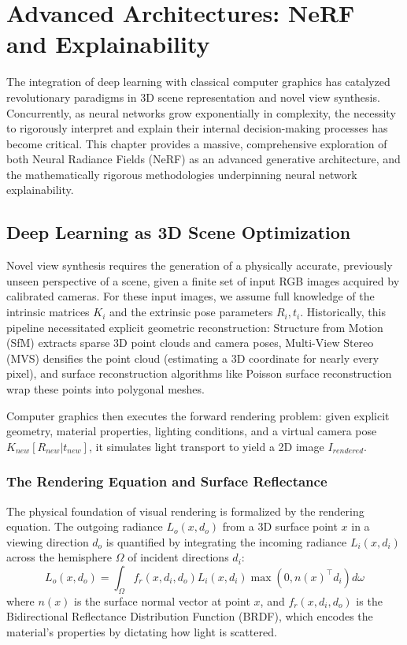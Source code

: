 \chapter{Advanced Architectures: NeRF and Explainability}
\label{ch:advanced_architectures}

The integration of deep learning with classical computer graphics has catalyzed revolutionary paradigms in 3D scene representation and novel view synthesis. Concurrently, as neural networks grow exponentially in complexity, the necessity to rigorously interpret and explain their internal decision-making processes has become critical. This chapter provides a massive, comprehensive exploration of both Neural Radiance Fields (NeRF) as an advanced generative architecture, and the mathematically rigorous methodologies underpinning neural network explainability.

\section{Deep Learning as 3D Scene Optimization}

Novel view synthesis requires the generation of a physically accurate, previously unseen perspective of a scene, given a finite set of input RGB images acquired by calibrated cameras. For these input images, we assume full knowledge of the intrinsic matrices $K_i$ and the extrinsic pose parameters $R_i, t_i$. Historically, this pipeline necessitated explicit geometric reconstruction: Structure from Motion (SfM) extracts sparse 3D point clouds and camera poses, Multi-View Stereo (MVS) densifies the point cloud (estimating a 3D coordinate for nearly every pixel), and surface reconstruction algorithms like Poisson surface reconstruction wrap these points into polygonal meshes. 

Computer graphics then executes the forward rendering problem: given explicit geometry, material properties, lighting conditions, and a virtual camera pose $K_{new}[R_{new} | t_{new}]$, it simulates light transport to yield a 2D image $I_{rendered}$.

\subsection{The Rendering Equation and Surface Reflectance}
The physical foundation of visual rendering is formalized by the rendering equation. The outgoing radiance $L_o(x, d_o)$ from a 3D surface point $x$ in a viewing direction $d_o$ is quantified by integrating the incoming radiance $L_i(x, d_i)$ across the hemisphere $\Omega$ of incident directions $d_i$:
\begin{equation}
L_o(x, d_o) = \int_\Omega f_r(x, d_i, d_o) L_i(x, d_i) \max(0, n(x)^\top d_i) d\omega
\end{equation}
where $n(x)$ is the surface normal vector at point $x$, and $f_r(x, d_i, d_o)$ is the Bidirectional Reflectance Distribution Function (BRDF), which encodes the material's properties by dictating how light is scattered.

